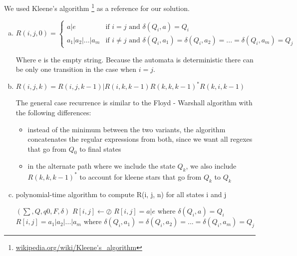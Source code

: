 
We used Kleene's algorithm \footnote{\url{wikipedia.org/wiki/Kleene's_algorithm}} as a reference for our solution.

\begin{enumerate}[(a)]


\item
\[ 
	R(i,j,0) = 
  \begin{cases} 
      a | e & \text{if } i = j \text{ and } \delta(Q_{i}, a) = Q_{i} \\
      a_{1} | a_{2} | ... | a_{m} & \text{if } i \neq j \text{ and } \delta(Q_{i}, a_{1}) = \delta(Q_{i}, a_{2}) = ...  = \delta(Q_{i}, a_{m}) = Q_{j}
   \end{cases}
\]

Where e is the empty string.
Because the automata is deterministic there can be only one transition in the case when $i = j$.

\item 

$R(i,j,k)	= R(i,j,k-1) | R(i, k, k - 1)R(k,k,k-1)^{*}R(k,i,k-1)$

The general case recurrence is similar to the Floyd - Warshall algorithm with the following differences:


\begin{itemize}
	\item instead of the minimum between the two variants, the algorithm concatenates the regular expressions from both, since we want all regexes that go from $Q_{0}$ to final states
	\item in the alternate path where we include the state $Q_{k}$, we also include $R(k,k,k-1)^{*}$ to account for kleene stars that go from $Q_{k}$ to $Q_{k}$
\end{itemize}

\item

\begin{algorithm}[H]
	\caption{polynomial-time algorithm to compute R(i, j, n) for all states i and j}
	\begin{algorithmic}
	  \Require {}
	  \Require $(\sum, Q, q0, F, \delta)$
				\State $R[i,j] \gets \oslash$ 
					\State $R[i,j]= a | e \text{ where } \delta(Q_{i}, a) = Q_{i} $
				\Else
					 \State $R[i,j] = a_{1} | a_{2} | ... | a_{m}  \text{ where } \delta(Q_{i}, a_{1}) = \delta(Q_{i}, a_{2}) = ...  = \delta(Q_{i}, a_{m}) = Q_{j}$
				\EndIf
			\EndFor
		\EndFor
		

\end{algorithmic}
\end{algorithm}
\end{enumerate}

